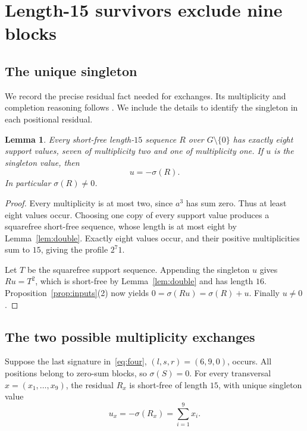 \documentclass[11pt]{article}
\newtheorem{lemma}[theorem]{Lemma}
\theoremstyle{definition}
\theoremstyle{remark}
\newcommand{\sig}{\sigma}
\begin{document}
\section{Length-15 survivors exclude nine blocks}\label{sec:nine}
\subsection{The unique singleton}
We record the precise residual fact needed for exchanges. Its multiplicity
and completion reasoning follows
\cite[proof of Lemma 27(3), together with Lemma 28]{Fan2012}.
We include the details to identify the singleton in each positional residual.

\begin{lemma}\label{lem:fifteen}
Every short-free length-$15$ sequence $R$ over $G\setminus\{0\}$ has
exactly eight support values, seven of multiplicity two and one of
multiplicity one. If $u$ is the singleton value, then
\begin{equation}\label{eq:singleton}
                         u=-\sig(R).
\end{equation}
In particular $\sig(R)\neq0$.
\end{lemma}
\begin{proof}
Every multiplicity is at most two, since $a^3$ has sum zero. Thus at
least eight values occur. Choosing one copy of every support value
produces a squarefree short-free sequence, whose length is at most eight
by Lemma~\ref{lem:double}. Exactly eight values occur, and their positive
multiplicities sum to $15$, giving the profile $2^7 1$.

Let $T$ be the squarefree support sequence. Appending the singleton $u$
gives $Ru=T^2$, which is short-free by Lemma~\ref{lem:double} and has
length $16$. Proposition~\ref{prop:inputs}(2) now yields
$0=\sig(Ru)=\sig(R)+u$. Finally $u\neq0$.
\end{proof}

\subsection{The two possible multiplicity exchanges}
Suppose the last signature in~\eqref{eq:four}, $(l,s,r)=(6,9,0)$,
occurs. All positions belong to zero-sum blocks, so $\sig(S)=0$.
For every transversal $x=(x_1,\ldots,x_9)$, the residual $R_x$ is
short-free of length $15$, with unique singleton value
\begin{equation}\label{eq:singleton-transversal}
              u_x=-\sig(R_x)=\sum_{i=1}^9 x_i.
\end{equation}
\end{document}

